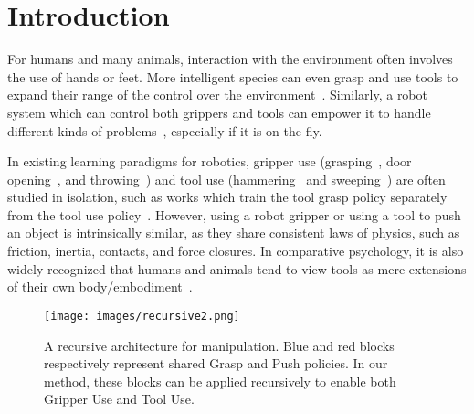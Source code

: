 \documentclass[10pt,twocolumn,letterpaper]{article}
\begin{document}


\section{Introduction}
\label{sec:intro}


For humans and many animals, interaction with the environment often involves the use of hands or feet. More intelligent species can even grasp and use tools to expand their range of the control over the environment~\cite{wimpenny2009cognitive,visalberghi2017cognitive,deak2014development}. Similarly, a robot system which can control both grippers and tools can empower it to handle different kinds of problems~\cite{zeng2018robotic}, especially if it is on the fly.

In existing learning paradigms for robotics, gripper use (\eg grasping~\cite{kalashnikov2018qt}, door opening~\cite{gu2017deep}, and throwing~\cite{zeng2020tossingbot}) and tool use (\eg hammering~\cite{fang2020learning} and sweeping~\cite{xie2019improvisation}) are often studied in isolation, such as works which train the tool grasp policy separately from the tool use policy~\cite{fang2020learning}.
However, using a robot gripper or using a tool to push an object is intrinsically similar, as they share consistent laws of physics, such as friction, inertia, contacts, and force closures. In comparative psychology, it is also widely recognized that humans and animals tend to view tools as mere extensions of their own body/embodiment~\cite{cardinali2009tool}.

\begin{figure}[t]
  \centering
   \texttt{[image: images/recursive2.png]}

   \caption{A recursive architecture for manipulation. Blue and red blocks respectively represent shared Grasp and Push policies. In our method, these blocks can be applied recursively to enable both Gripper Use and Tool Use. }
   \vspace{-20pt}
   \label{fig:onecol}
\end{figure}
\end{document}
